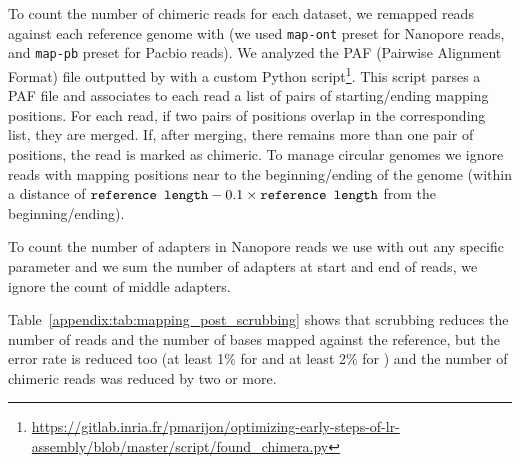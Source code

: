 \documentclass[./main.tex]{subfiles}
\begin{document}
To count the number of chimeric reads for each dataset, we remapped reads against each reference genome with \minimap (we used \texttt{map-ont} preset for Nanopore reads, and \texttt{map-pb} preset for Pacbio reads). We analyzed the PAF (Pairwise Alignment Format) file outputted by \minimap with a custom Python script\footnote{\url{https://gitlab.inria.fr/pmarijon/optimizing-early-steps-of-lr-assembly/blob/master/script/found_chimera.py}}. This script parses a PAF file and associates to each read a list of pairs of starting/ending mapping positions. For each read, if two pairs of positions overlap in the corresponding list, they are merged. If, after merging, there remains more than one pair of positions, the read is marked as chimeric. To manage circular genomes we ignore reads with mapping positions near to the beginning/ending of the genome (within a distance of $\mbox{\texttt{reference length}} - 0.1 \times \mbox{\texttt{reference length}}$ from the beginning/ending).

To count the number of adapters in Nanopore reads we use  \cite{porechop} with out any specific parameter and we sum the number of adapters at start and end of reads, we ignore the count of middle adapters.

Table~\ref{appendix:tab:mapping_post_scrubbing} shows that scrubbing reduces the number of reads and the number of bases mapped against the reference, but the error rate is reduced too (at least 1\% for \yacrd and at least 2\% for \dascrubber) and the number of chimeric reads was reduced by two or more.
 
\end{document}

